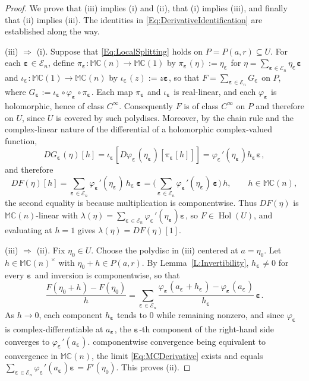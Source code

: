 \documentclass[12pt]{amsart}
\theoremstyle{plain}
\theoremstyle{definition}
\numberwithin{equation}{section}
\newcommand{\bep}[1]{\bm{\varepsilon_{#1}}}
\newcommand{\mC}{\mathbb{C}}
\newcommand{\mM}{\mathbb{M}}
\newcommand{\ra}{\rightarrow}
\newcommand{\Ra}{\Rightarrow}
\DeclareMathOperator{\hol}{Hol}
\begin{document}
    \begin{proof}
    We prove that (iii) implies (i) and (ii), that (i) implies (iii), and
    finally that (ii) implies (iii). The identities in
    \eqref{Eq:DerivativeIdentification} are established along the way.

    (iii) $\Ra$ (i). Suppose that \eqref{Eq:LocalSplitting} holds on
    $P = P ( a , r ) \subseteq U$. 
    For each $\bep{} \in \mathcal{E}_n$, define $\pi_{\bep{}} : \mM \mC (n) \ra \mM \mC (1)$ by $\pi_{\bep{}} (\eta) := \eta_{\bep{}}$ for $\eta = \sum_{\bep{} \in \mathcal{E}_n} \eta_{\bep{}} \bep{}$ and $\iota_{\bep{}} : \mM \mC (1) \ra \mM \mC (n)$ by $\iota_{\bep{}} (z) := z \bep{}$, so that $F = \sum_{\bep{} \in \mathcal{E}_n} G_{\bep{}}$ on $P$, where $G_{\bep{}} := \iota_{\bep{}} \circ \varphi_{\bep{}} \circ \pi_{\bep{}}$. 
    Each map $\pi_{\bep{}}$ and $\iota_{\bep{}}$ is real-linear, and each $\varphi_{\bep{}}$ is holomorphic, hence of class $C^\infty$. Consequently $F$ is of class $C^\infty$ on $P$ and therefore on $U$, since $U$ is covered by such polydiscs. 
    Moreover, by the chain rule and the complex-linear nature of the differential of a holomorphic complex-valued function, 
    $$
        DG_{\bep{}} (\eta) [h] = \iota_{\bep{}} [ D\varphi_{\bep{}} (\eta_{\bep{}}) [ \pi_{\bep{}} [h]]] = \varphi_{\bep{}}' (\eta_{\bep{}}) h_{\bep{}} \bep{} ,
    $$
    and therefore
        \[
        DF (\eta ) [ h ]
        = \sum_{\bep{} \in \mathcal{E}_n}\varphi_{\bep{}} ' ( \eta_{\bep{}} )\, h_{\bep{}}\, \bep{}
        = \Big( \sum_{\bep{} \in \mathcal{E}_n} \varphi_{\bep{}} ' ( \eta_{\bep{}} )\, \bep{} \Big)\, h ,
        \qquad h \in \mM \mC(n) ,
        \]
    the second equality is because multiplication is componentwise. Thus
    $DF (\eta )$ is $\mM \mC(n)$-linear with
    $\lambda (\eta ) = \sum_{\bep{} \in \mathcal{E}_n} \varphi_{\bep{}} ' ( \eta_{\bep{}} ) \bep{}$, so
    $F \in \hol (U)$, and evaluating at $h = 1$ gives
    $\lambda (\eta ) = DF (\eta ) [ 1 ]$.

    (iii) $\Ra$ (ii). Fix $\eta_0 \in U$. Choose the polydisc in (iii) centered at $a = \eta_0$. Let $h \in \mM \mC(n)^\times$
    with $\eta_0 + h \in P ( a , r )$. By Lemma~\ref{L:Invertibility},
    $h_{\bep{}} \neq 0$ for every $\bep{}$ and inversion is componentwise, so that
        \[
        \frac{F (\eta_0 + h ) - F (\eta_0 )}{h} 
        = \sum_{\bep{} \in \mathcal{E}_n}
        \frac{ \varphi_{\bep{}} ( a_{\bep{}} + h_{\bep{}} ) - \varphi_{\bep{}} ( a_{\bep{}} ) }{ h_{\bep{}} }\,
        \bep{} .
        \]
    As $h \ra 0$, each component $h_{\bep{}}$ tends to $0$ while remaining nonzero,
    and since $\varphi_{\bep{}}$ is complex-differentiable at $a_{\bep{}}$, the ${\bep{}}$-th
    component of the right-hand side converges to $\varphi_{\bep{}} ' ( a_{\bep{}} )$.
    componentwise convergence being equivalent to convergence in
    $\mM \mC(n)$, the limit \eqref{Eq:MCDerivative} exists and equals
    $\sum_{\bep{} \in \mathcal{E}_n} \varphi_{\bep{}} ' ( a_{\bep{}} ) \bep{} = F'(\eta_0)$. This proves
    (ii).


\end{proof}
\end{document}
